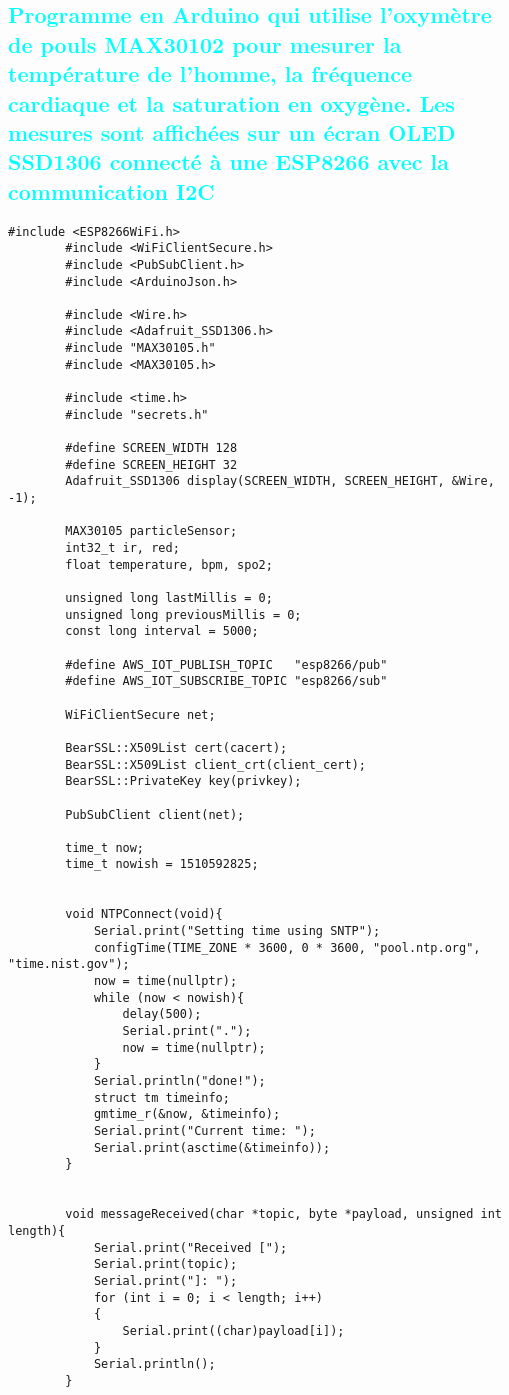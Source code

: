 


\begin{flushleft}
	\section*{\textcolor{cyan}{Programme en Arduino qui utilise l'oxymètre de pouls MAX30102 pour mesurer la température de l'homme, la fréquence cardiaque et la saturation en oxygène. Les mesures sont affichées sur un écran OLED SSD1306 connecté à une ESP8266 avec la communication I2C}}
\end{flushleft}

\begin{flushleft}
	\begin{lstlisting}[style=CStyle]
		#include <ESP8266WiFi.h>
		#include <WiFiClientSecure.h>
		#include <PubSubClient.h>
		#include <ArduinoJson.h>
		
		#include <Wire.h>
		#include <Adafruit_SSD1306.h>
		#include "MAX30105.h"
		#include <MAX30105.h>
		
		#include <time.h>
		#include "secrets.h"
		
		#define SCREEN_WIDTH 128
		#define SCREEN_HEIGHT 32
		Adafruit_SSD1306 display(SCREEN_WIDTH, SCREEN_HEIGHT, &Wire, -1);
		
		MAX30105 particleSensor;
		int32_t ir, red;
		float temperature, bpm, spo2;
		
		unsigned long lastMillis = 0;
		unsigned long previousMillis = 0;
		const long interval = 5000;
		
		#define AWS_IOT_PUBLISH_TOPIC   "esp8266/pub"
		#define AWS_IOT_SUBSCRIBE_TOPIC "esp8266/sub"
		
		WiFiClientSecure net;
		
		BearSSL::X509List cert(cacert);
		BearSSL::X509List client_crt(client_cert);
		BearSSL::PrivateKey key(privkey);
		
		PubSubClient client(net);
		
		time_t now;
		time_t nowish = 1510592825;
		
		
		void NTPConnect(void){
			Serial.print("Setting time using SNTP");
			configTime(TIME_ZONE * 3600, 0 * 3600, "pool.ntp.org", "time.nist.gov");
			now = time(nullptr);
			while (now < nowish){
				delay(500);
				Serial.print(".");
				now = time(nullptr);
			}
			Serial.println("done!");
			struct tm timeinfo;
			gmtime_r(&now, &timeinfo);
			Serial.print("Current time: ");
			Serial.print(asctime(&timeinfo));
		}
		
		
		void messageReceived(char *topic, byte *payload, unsigned int length){
			Serial.print("Received [");
			Serial.print(topic);
			Serial.print("]: ");
			for (int i = 0; i < length; i++)
			{
				Serial.print((char)payload[i]);
			}
			Serial.println();
		}
		

\end{lstlisting}
\end{flushleft}
